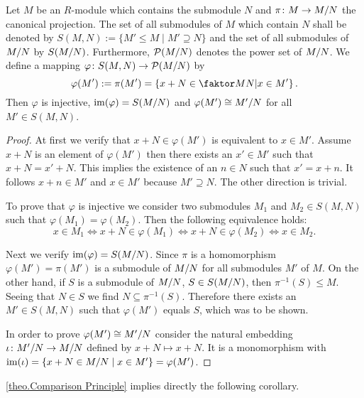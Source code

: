 \begin{thm} \label{theo.Comparison Principle}
Let $M$ be an $R$-module which contains the submodule $N$ and $\pi\colon M\to\MtN$ the canonical projection. The set of all submodules of $M$ which contain $N$ shall be denoted by $S(M,N):=\lbrace M'\leq M \mid M'\supseteq N\rbrace$ and the set of all submodules of $\MtN$ by $S(\MtN)$. Furthermore, $\mathcal{P}(\MtN)$ denotes the power set of $\MtN$. We define a mapping $\varphi\colon S(M,N)\to \mathcal{P}(\MtN)$ by
\begin{equation*}
\varphi(M'):=\pi(M')=\left\lbrace x+N\in \MTN \middle\arrowvert x\in M'\right\rbrace.
\end{equation*}
Then $\varphi$ is injective, $\im(\varphi)=S(\MtN)$ and $\varphi(M')\cong\nicefrac{M'}{N}$ for all $M'\in S(M,N)$.
\end{thm}
\begin{proof}
At first we verify that $x+N\in \varphi(M')$ is equivalent to $x\in M'$. Assume $x+N$ is an element of $\varphi(M')$ then there exists an $x'\in M'$ such that $x+N=x'+N$. This implies the existence of an $n\in N$ such that $x'=x+n$. It follows $x+n\in M'$ and $x\in M'$ because $M'\supseteq N$. The other direction is trivial.

To prove that $\varphi$ is injective we consider two submodules $M_1$ and $M_2\in S(M,N)$ such that $\varphi(M_1)=\varphi(M_2)$. Then the following equivalence holds:
\begin{equation*}
x\in M_1\Leftrightarrow x+N\in \varphi(M_1)\Leftrightarrow x+N\in\varphi(M_2)\Leftrightarrow x\in M_2.
\end{equation*}

Next we verify $\im(\varphi)=S(\MtN)$. Since $\pi$ is a homomorphism $\varphi(M')=\pi(M')$ is a submodule of $\MtN$ for all submodules $M'$ of $M$. On the other hand, if $S$ is a submodule of $\MtN$, \ie{} $S\in S(\MtN)$, then $\pi^{-1}(S)\leq M$. Seeing that $N\in S$ we find $N\subseteq\pi^{-1}(S)$. Therefore there exists an $M'\in S(M,N)$ such that $\varphi(M')$ equals $S$, which was to be shown.

In order to prove $\varphi(M')\cong\nicefrac{M'}{N}$ consider the natural embedding $\iota\colon \nicefrac{M'}{N}\to\MtN$ defined by $x+N\mapsto x+N$. It is a monomorphism with $\im(\iota)=\lbrace x+N\in\MtN \mid x\in M'\rbrace=\varphi(M')$.
\end{proof}

\cref{theo.Comparison Principle} implies directly the following corollary.

